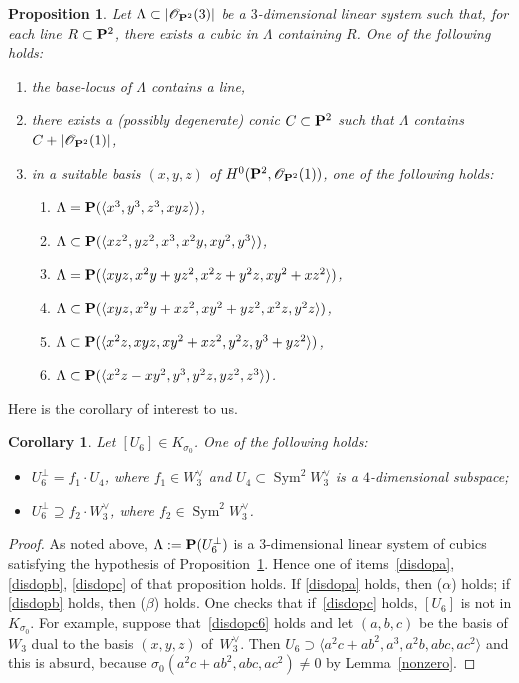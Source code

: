 \documentclass[11pt]{article}
\let\mathcal\mathscr
\newenvironment{enumeratea}
{\bgroup\def\theenumi{\alph{enumi}}\def\theenumii{\arabic{enumii}}\begin{enumerate}}
{\end{enumerate}\egroup}
\newtheorem{coro}[lemm]{Corollary}
\newtheorem{prop}[lemm]{Proposition}
\theoremstyle{definition}
\newcommand\cO{\mathcal{O}}\let\OO\cO
\let\la\langle
\let\ra\rangle
\DeclareMathOperator{\Sym}{Sym}
\begin{document}
\begin{prop}\label{disdop}
Let $\Lambda\subset|\cO_{\PP^2}(3)|$ be a $3$-dimensional linear system such that, for each line $R\subset \PP^2$, there exists a cubic in $\Lambda$ containing $R$. One of the following holds:
\begin{enumeratea}
\item\label{disdopa}
the base-locus of $\Lambda$ contains a line,
\item\label{disdopb}
there exists a (possibly degenerate) conic $C\subset \PP^2$ such that $\Lambda$ contains $C+|\cO_{\PP^2}(1)|$,
\item\label{disdopc}
in a suitable basis $(x,y,z)$ of $H^0(\PP^2,\cO_{\PP^2}(1))$, one of the following holds:
\begin{enumerate}
\item\label{disdopc1}
$\Lambda=\PP(\la x^3,y^3,z^3,xyz\ra)$,
\item\label{disdopc2}
$\Lambda\subset\PP(\la xz^2,yz^2,x^3,x^2y,xy^2,y^3\ra)$,
\item\label{disdopc3}
$\Lambda=\PP(\la xyz,x^2y+yz^2,x^2z+y^2z,xy^2+xz^2\ra)$,
\item\label{disdopc4}
$\Lambda\subset\PP(\la xyz,x^2y+xz^2,xy^2+yz^2,x^2z,y^2z\ra)$,
\item\label{disdopc5}
$\Lambda\subset\PP(\la x^2z, xyz, xy^2+xz^2,y^2z, y^3+yz^2 \ra)$,
\item\label{disdopc6}
$\Lambda\subset\PP(\la x^2z-xy^2, y^3, y^2z, yz^2, z^3 \ra)$.
\end{enumerate}
\end{enumeratea}
\end{prop}

Here is the corollary of interest to us.

\begin{coro}\label{tutti2jet}
Let $[U_6]\in K_{\sigma_0}$. One of the following holds:
\begin{itemize}
\item[$(\alpha)$]
$U_6^{\bot}=f_1\cdot U_4$, where $ f_1\in W_3^{\vee}$ and $U_4\subset\Sym^2\! W_3^{\vee}$ is a $4$-dimensional subspace;
\item[$(\beta)$]
$U_6^{\bot}\supseteq f_2\cdot W_3^{\vee}$, where $ f_2\in\Sym^2\! W_3^{\vee}$.
\end{itemize}
\end{coro}

\begin{proof}
As noted above, $\Lambda:=\PP(U^{\bot}_6)$ is a $3$-dimensional linear system of cubics satisfying the hypothesis of Proposition~\ref{disdop}. Hence one of items~\eqref{disdopa}, \eqref{disdopb}, \eqref{disdopc} of that proposition holds. If \eqref{disdopa} holds, then ($\alpha$) holds; if
\eqref{disdopb} holds, then ($\beta$) holds. One checks that if~\eqref{disdopc} holds, $[U_6]$ is not in $K_{\sigma_0}$. For example, suppose that~\eqref{disdopc6} holds and let $(a,b,c)$ be the basis of $W_3$ dual to the basis $(x,y,z)$ of~$W_3^{\vee}$. Then $U_6\supset\la a^2c+ab^2,a^3,a^2b,abc,ac^2\ra$ and this is absurd, because
$\sigma_0(a^2c+ab^2,abc,ac^2)\not=0$ by Lemma~\ref{nonzero}.
\end{proof}
\end{document}
